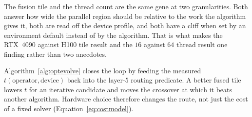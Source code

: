 The fusion tile and the thread count are the same gene at two
granularities. Both answer how wide the parallel region should be relative
to the work the algorithm gives it, both are read off the device profile,
and both have a cliff when set by an environment default instead of by the
algorithm. That is what makes the RTX~4090 against H100 tile result and
the $16$ against $64$ thread result one finding rather than two anecdotes.

Algorithm~\ref{alg:optevolve} closes the loop by feeding the measured
$t(\mathrm{operator},\mathrm{device})$ back into the layer-5 routing
predicate. A better fused tile lowers $t$ for an iterative candidate and
moves the crossover at which it beats another algorithm. Hardware choice
therefore changes the route, not just the cost of a fixed solver
(Equation~\ref{eq:costmodel}).
